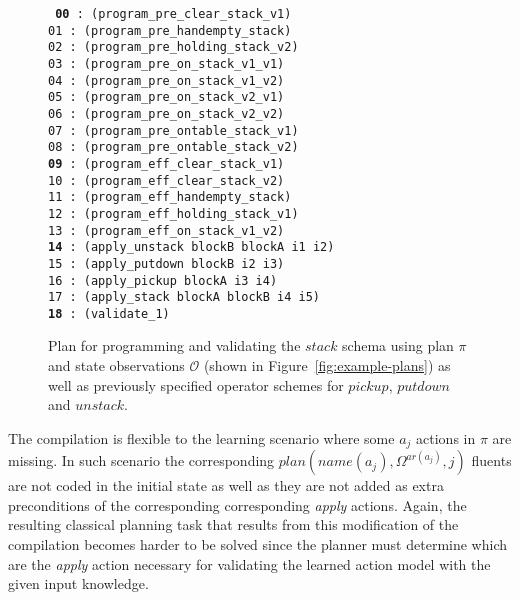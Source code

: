 \documentclass[3p,times]{elsarticle}
\begin{document}
\begin{figure}[hbt!]
{\footnotesize\tt
     {\bf 00} : (program\_pre\_clear\_stack\_v1)\\
     01 : (program\_pre\_handempty\_stack)\\
     02 : (program\_pre\_holding\_stack\_v2)\\
     03 : (program\_pre\_on\_stack\_v1\_v1)\\
     04 : (program\_pre\_on\_stack\_v1\_v2)\\
     05 : (program\_pre\_on\_stack\_v2\_v1)\\
     06 : (program\_pre\_on\_stack\_v2\_v2)\\
     07 : (program\_pre\_ontable\_stack\_v1)\\
     08 : (program\_pre\_ontable\_stack\_v2)\\
     {\bf 09} : (program\_eff\_clear\_stack\_v1)\\
    10 : (program\_eff\_clear\_stack\_v2)\\
    11 : (program\_eff\_handempty\_stack)\\
    12 : (program\_eff\_holding\_stack\_v1)\\
    13 : (program\_eff\_on\_stack\_v1\_v2)\\
    {\bf 14} : (apply\_unstack blockB blockA i1 i2)\\
    15 : (apply\_putdown blockB i2 i3)\\
    16 : (apply\_pickup blockA i3 i4)\\
    17 : (apply\_stack blockA blockB i4 i5)\\
    {\bf 18} : (validate\_1)
}
 \caption{\small Plan for programming and validating the $stack$ schema using plan $\pi$ and state observations $\mathcal{O}$ (shown in Figure~\ref{fig:example-plans}) as well as previously specified operator schemes for $pickup$, $putdown$ and $unstack$.}
\label{fig:plan-lplan}
\end{figure}

The compilation is flexible to the learning scenario where some $a_j$ actions in $\pi$ are missing. In such scenario the corresponding $plan(name(a_j),\Omega^{ar(a_j)},j)$ fluents are not coded in the initial state as well as they are not added as extra preconditions of the corresponding corresponding {\em apply} actions. Again, the resulting classical planning task that results from this modification of the compilation becomes harder to be solved since the planner must determine which are the {\em apply} action necessary for validating the learned action model with the given input knowledge.
\end{document}
